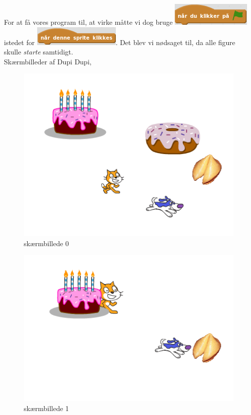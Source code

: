 \documentclass[a4paper]{article}
\begin{document}
For at få vores program til, at virke måtte vi dog bruge \includegraphics[scale=0.5]{flag.png} istedet for \includegraphics[scale=0.5]{sprite.png}.
Det blev vi nødsaget til, da alle figure skulle \textit{starte} samtidigt.\\
Skærmbilleder af Dupi Dupi,\\
\begin{figure}[h]
	\centering
	\includegraphics[scale=0.3]{screen_0.png}
	\caption{skærmbillede 0}
	\label{fig: skitse}
\end{figure}
\begin{figure}[h]
	\centering
	\includegraphics[scale=0.3]{screen_1.png}
	\caption{skærmbillede 1}
	\label{fig: skitse}
\end{figure}
\end{document}
